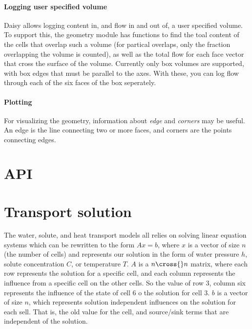 \documentclass[a4paper,11pt,twoside]{article}
\begin{document}
\paragraph{Logging user specified volume}
Daisy allows logging content in, and flow in and out of, a user
specified volume.  To support this, the geometry module has functions
to find the toal content of the cells that overlap such a volume (for
partical overlaps, only the fraction overlapping the volume is
counted), as well as the total flow for each face vector that cross
the surface of the volume.  Currently only box volumes are supported,
with box edges that must be parallel to the axes.  With these, you can
log flow through each of the six faces of the box seperately.

\paragraph{Plotting}

For visualizing the geometry, information about \emph{edge} and
\emph{corners} may be useful.  An edge is the line connecting two or
more faces, and corners are the points connecting edges.

\section{API}

\section{Transport solution}

The water, solute, and heat transport models all relies on solving
linear equation systems which can be rewritten to the form $A x = b$,
where $x$ is a vector of size $n$ (the number of cells) and represents
our solution in the form of water pressure $h$, solute concentration
$C$, or temperature $T$.  $A$ is a $n\cross{}n$ matrix, where each row
represents the solution for a specific cell, and each column
represents the influence from a specific cell on the other cells.  So
the value of row 3, column six represents the influence of the state
of cell 6 o the solution for cell 3.  $b$ is a vector of size $n$,
which represents solution independent influences on the solution for
each sell.  That is, the old value for the cell, and source/sink terms
that are independent of the solution.
\end{document}
